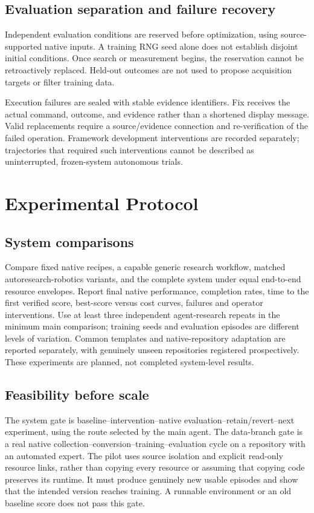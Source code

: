 \documentclass[10pt,twocolumn,letterpaper]{article}
\begin{document}
\subsection{Evaluation separation and failure recovery}
Independent evaluation conditions are reserved before optimization, using
source-supported native inputs. A training RNG seed alone does not establish
disjoint initial conditions. Once search or measurement begins, the reservation
cannot be retroactively replaced. Held-out outcomes are not used to propose
acquisition targets or filter training data.

Execution failures are sealed with stable evidence identifiers. Fix receives the
actual command, outcome, and evidence rather than a shortened display message.
Valid replacements require a source/evidence connection and re-verification of
the failed operation. Framework development interventions are recorded separately;
trajectories that required such interventions cannot be described as uninterrupted,
frozen-system autonomous trials.

\section{Experimental Protocol}
\subsection{System comparisons}
Compare fixed native recipes, a capable generic research workflow, matched
autoresearch-robotics variants, and the complete system under equal end-to-end
resource envelopes. Report final native performance, completion rates, time to
the first verified score, best-score versus cost curves, failures and operator
interventions. Use at least three independent agent-research repeats in the
minimum main comparison; training seeds and evaluation episodes are different
levels of variation. Common templates and native-repository adaptation are
reported separately, with genuinely unseen repositories registered prospectively.
These experiments are planned, not completed system-level results.

\subsection{Feasibility before scale}
The system gate is baseline--intervention--native evaluation--retain/revert--next
experiment, using the route selected by the main agent. The data-branch gate is
a real native collection--conversion--training--evaluation cycle
on a repository with an automated expert. The pilot uses source isolation and
explicit read-only resource links, rather than copying every resource or assuming
that copying code preserves its runtime. It must produce genuinely new usable
episodes and show that the intended version reaches training. A runnable environment
or an old baseline score does not pass this gate.
\end{document}
